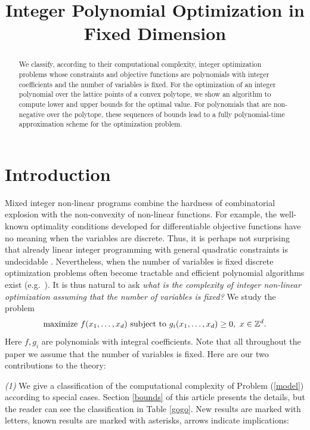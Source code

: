 \documentclass[twoside]{article}
\title{Integer Polynomial Optimization in Fixed Dimension}
\newcommand{\Z}{\mathbb Z}
\newcommand{\1}{{\bf 1}}
\begin{document}
\maketitle

\begin{abstract}
  We classify, according to their computational complexity, integer
  optimization problems whose constraints and objective functions are
  polynomials with integer coefficients and the number of variables is
  fixed. For the optimization of an integer polynomial over 
  the lattice points of a convex polytope, we show an algorithm to compute 
  lower and upper bounds for the optimal value. 
  For polynomials that are non-negative over the polytope,
  these sequences of bounds lead to a fully polynomial-time approximation
  scheme for the optimization problem.
\end{abstract}

\section{Introduction}

Mixed integer non-linear programs combine the hardness of
combinatorial explosion with the non-convexity of non-linear
functions. For example, the well-known optimality conditions
developed for differentiable objective functions have no meaning when
the variables are discrete. Thus, it is perhaps not surprising that
already linear integer programming with general quadratic constraints
is undecidable \cite{jeroslow}. Nevertheless, when the number of
variables is fixed discrete optimization problems often become
tractable and efficient polynomial algorithms exist (e.g.\
\cite{bar,khachiyanporkolab,lenstra}). It is thus natural to ask {\em
  what is the complexity of integer non-linear optimization assuming
  that the number of variables is fixed?} We study the problem
\begin{equation} 
\label{model} \hbox{maximize} \  f(x_1,\dots,x_d) \
  \hbox{subject to} \ g_i(x_1,\dots,x_d) \geq 0, \ x \in  \Z^d. 
\end{equation}
Here $f,g_i$ are polynomials with integral coefficients. Note that
all throughout the paper we assume that the number of variables is
fixed. Here are our two contributions to the theory:

\noindent \emph{(1)} We give a classification of the computational
complexity of Problem (\ref{model}) according to special
cases. Section \ref{bounds} of this article presents the details, but
the reader can see the classification in Table \ref{gogo}. New results
are marked with letters, known results are marked with asterisks, arrows
indicate implications:
\end{document}
